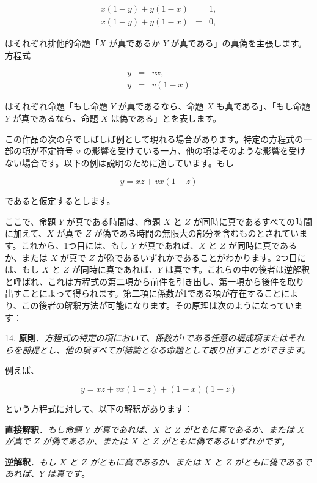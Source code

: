 \documentclass[a4paper,11pt,openany]{ltjsbook}
\begin{document}
\begin{eqnarray*}
x(1-y) + y(1-x) &=& 1,\\
x (1 - y) + y (1 - x) &=& 0,
\end{eqnarray*}

はそれぞれ排他的命題「$X$ が真であるか $Y$ が真である」の真偽を主張します。方程式

\begin{eqnarray*}
y &=& vx,\\
y &=& v(1-x)
\end{eqnarray*}

はそれぞれ命題「もし命題 $Y$ が真であるなら、命題 $X$ も真である」、「もし命題 $Y$ が真であるなら、命題 $X$ は偽である」とを表します。

この作品の次の章でしばしば例として現れる場合があります。特定の方程式の一部の項が不定符号 $v$ の影響を受けている一方、他の項はそのような影響を受けない場合です。以下の例は説明のために適しています。もし

\[
y = xz + vx (1 - z)
\]

であると仮定するとします。

ここで、命題 \( Y \) が真である時間は、命題 \( X \) と \( Z \) が同時に真であるすべての時間に加えて、\( X \) が真で \( Z \) が偽である時間の無限大の部分を含むものとされています。これから、1つ目には、もし \( Y \) が真であれば、\( X \) と \( Z \) が同時に真であるか、または \( X \) が真で \( Z \) が偽であるいずれかであることがわかります。2つ目には、もし \( X \) と \( Z \) が同時に真であれば、\( Y \) は真です。これらの中の後者は逆解釈と呼ばれ、これは方程式の第二項から前件を引き出し、第一項から後件を取り出すことによって得られます。第二項に係数が1である項が存在することにより、この後者の解釈方法が可能になります。その原理は次のようになっています：

14. \textbf{原則}．\textit{方程式の特定の項において、係数が1である任意の構成項またはそれらを前提とし、他の項すべてが結論となる命題として取り出すことができます。}

例えば、

\[
y = xz + vx (1 - z) + (1 - x) (1 - z)
\]

という方程式に対して、以下の解釈があります：

\textbf{直接解釈}．\textit{もし命題 \( Y \) が真であれば、\( X \) と \( Z \) がともに真であるか、または \( X \) が真で \( Z \) が偽であるか、または \( X \) と \( Z \) がともに偽であるいずれかです}。

\textbf{逆解釈}．\textit{もし \( X \) と \( Z \) がともに真であるか、または \( X \) と \( Z \) がともに偽であるであれば、\( Y \) は真です}。
\end{document}
